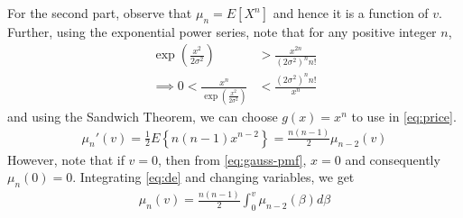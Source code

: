\documentclass{beamer}
\begin{document}
\begin{frame}
	For the second part, observe that $\mu_n = E[X^n]$ and hence it is a function of $v$. Further, using the exponential power series, note that for any positive integer $n$,
	\begin{align}
		\exp{\left(\frac{x^2}{2\sigma^2}\right)} &> \frac{x^{2n}}{(2\sigma^2)^nn!} \\
		\implies 0 < \frac{x^n}{\exp{\left(\frac{x^2}{2\sigma^2}\right)}} &< \frac{(2\sigma^2)^nn!}{x^n}
		\label{eq:sandwich}
	\end{align}
	and using the Sandwich Theorem, we can choose $g(x) = x^n$ to use in \eqref{eq:price}.
	\begin{align}
		\mu_n'(v) = \frac{1}{2}E\left\{n(n - 1)x^{n - 2}\right\} = \frac{n(n - 1)}{2}\mu_{n - 2}{(v)}
		\label{eq:de}
	\end{align}
	However, note that if $v = 0$, then from \eqref{eq:gauss-pmf}, $x = 0$ and consequently $\mu_n(0) = 0$. Integrating \eqref{eq:de} and changing variables, we get
	\begin{align}
		\mu_n(v) = \frac{n(n - 1)}{2}\int_{0}^{v}\mu_{n - 2}(\beta)d\beta
		\label{eq:sol2}
	\end{align}
\end{frame}
\end{document}
